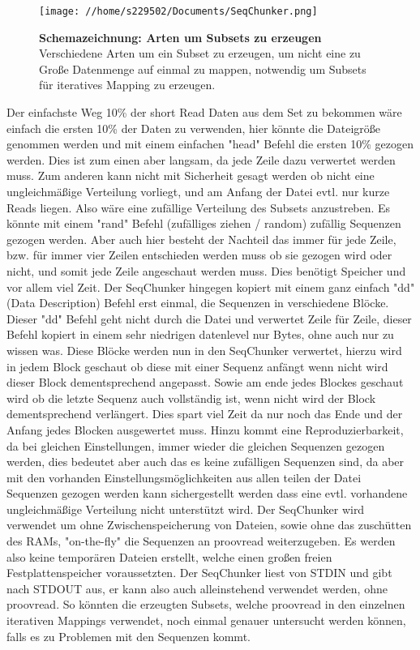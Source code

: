 \documentclass{scrartcl}
\begin{document}
\begin{figure}
\texttt{[image: //home/s229502/Documents/SeqChunker.png]}
\caption[Schemazeichnung: Arten um Subsets zu erzeugen]{\textbf{Schemazeichnung: Arten um Subsets zu erzeugen} Verschiedene Arten um ein Subset zu erzeugen, um nicht eine zu Große Datenmenge auf einmal zu mappen, notwendig um Subsets für iteratives Mapping zu erzeugen.}
\end{figure}

Der einfachste Weg 10\% der short Read Daten aus dem Set zu bekommen wäre einfach die ersten 10\% der Daten
zu verwenden, hier könnte die Dateigröße genommen werden und mit einem einfachen "head" Befehl die ersten 
10\% gezogen werden. Dies ist zum einen aber langsam, da jede Zeile dazu verwertet werden muss.
Zum anderen kann nicht mit Sicherheit gesagt werden ob nicht eine ungleichmäßige Verteilung vorliegt, und 
am Anfang der Datei evtl. nur kurze Reads liegen. Also wäre eine zufällige Verteilung des Subsets 
anzustreben. Es könnte mit einem "rand" Befehl (zufälliges ziehen / random) zufällig Sequenzen gezogen werden. Aber auch hier besteht 
der Nachteil das immer für jede Zeile, bzw. für immer vier Zeilen entschieden werden muss ob sie gezogen wird
oder nicht, und somit jede Zeile angeschaut werden muss. Dies benötigt Speicher und vor allem viel Zeit. 
Der SeqChunker hingegen kopiert mit einem ganz einfach "dd" (Data Description) Befehl erst einmal, die Sequenzen in verschiedene
Blöcke. Dieser "dd" Befehl geht nicht durch die Datei und verwertet Zeile für Zeile, dieser Befehl
kopiert in einem sehr niedrigen datenlevel nur Bytes, ohne auch nur zu wissen was. Diese Blöcke werden
nun in den SeqChunker verwertet, hierzu wird in jedem Block geschaut ob diese mit einer Sequenz anfängt 
wenn nicht wird dieser Block dementsprechend angepasst. Sowie am ende jedes Blockes geschaut wird ob die letzte
Sequenz auch vollständig ist, wenn nicht wird der Block dementsprechend verlängert. Dies spart viel Zeit da nur noch 
das Ende und der Anfang jedes Blocken ausgewertet muss. Hinzu kommt eine Reproduzierbarkeit, da bei gleichen
Einstellungen, immer wieder die gleichen Sequenzen gezogen werden, dies bedeutet aber auch das es keine zufälligen
Sequenzen sind, da aber mit den vorhanden Einstellungsmöglichkeiten aus allen teilen der Datei Sequenzen gezogen werden
kann sichergestellt werden dass eine evtl. vorhandene ungleichmäßige Verteilung nicht unterstützt wird. 
Der SeqChunker wird verwendet um ohne Zwischenspeicherung von Dateien, sowie ohne das zuschütten des RAMs, 
"on-the-fly" die Sequenzen an proovread weiterzugeben. Es werden also keine temporären Dateien erstellt, welche
einen großen freien Festplattenspeicher voraussetzten. Der SeqChunker liest von STDIN und gibt nach STDOUT aus, er kann
also auch alleinstehend verwendet werden, ohne proovread. So könnten die erzeugten Subsets, welche proovread in den einzelnen
iterativen Mappings verwendet, noch einmal genauer untersucht werden können, falls es zu Problemen mit den Sequenzen kommt.
\end{document}
